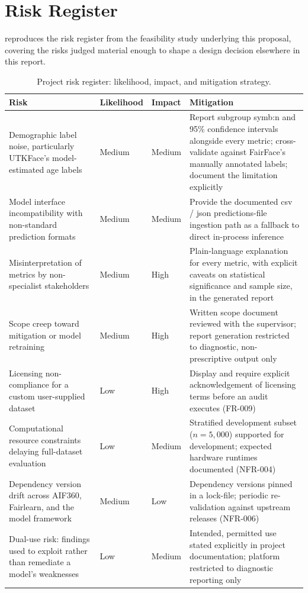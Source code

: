 \chapter{Risk Register}
\label{app:riskregister}

 reproduces the risk register from the feasibility study underlying this proposal, covering the risks judged material enough to shape a design decision elsewhere in this report.

\begin{table}[htbp]
    \centering
    \caption{Project risk register: likelihood, impact, and mitigation strategy.}
    \label{tab:riskregister}
    \begin{tabular}{p{3.3cm}p{1.6cm}p{1.6cm}p{6.5cm}}
        \toprule
        \textbf{Risk} & \textbf{Likelihood} & \textbf{Impact} & \textbf{Mitigation} \\
        \midrule
        Demographic label noise, particularly UTKFace's model-estimated age labels & Medium & Medium & Report subgroup \gls{symb:n} and 95\% confidence intervals alongside every metric; cross-validate against FairFace's manually annotated labels; document the limitation explicitly \\
        Model interface incompatibility with non-standard prediction formats & Medium & Medium & Provide the documented \gls{csv} / \gls{json} predictions-file ingestion path as a fallback to direct in-process inference \\
        Misinterpretation of metrics by non-specialist stakeholders & Medium & High & Plain-language explanation for every metric, with explicit caveats on statistical significance and sample size, in the generated report \\
        Scope creep toward mitigation or model retraining & Medium & High & Written scope document reviewed with the supervisor; report generation restricted to diagnostic, non-prescriptive output only \\
        Licensing non-compliance for a custom user-supplied dataset & Low & High & Display and require explicit acknowledgement of licensing terms before an audit executes (FR-009) \\
        Computational resource constraints delaying full-dataset evaluation & Low & Medium & Stratified development subset ($n=5{,}000$) supported for development; expected hardware runtimes documented (NFR-004) \\
        Dependency version drift across AIF360, Fairlearn, and the model framework & Medium & Low & Dependency versions pinned in a lock-file; periodic re-validation against upstream releases (NFR-006) \\
        Dual-use risk: findings used to exploit rather than remediate a model's weaknesses & Low & Medium & Intended, permitted use stated explicitly in project documentation; platform restricted to diagnostic reporting only \\
        \bottomrule
    \end{tabular}
\end{table}
